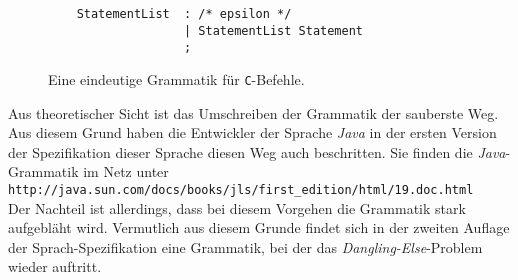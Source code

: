 \begin{enumerate}
\begin{figure}[!ht]
\begin{Verbatim}
    StatementList  : /* epsilon */
                   | StatementList Statement
                   ;
    \end{Verbatim}
    \vspace*{-0.3cm}
    \caption{Eine eindeutige Grammatik f\"ur \texttt{C}-Befehle.}
    \label{fig:dangling-else-correct.y}
\end{figure}

      Aus theoretischer Sicht ist das Umschreiben der Grammatik der sauberste Weg.  
      Aus diesem Grund haben die Entwickler der Sprache \textsl{Java} in der ersten Version der
      Spezifikation dieser Sprache \cite{gosling:96} diesen Weg auch beschritten.  Sie finden die
      \textsl{Java}-Grammatik im Netz unter
      \\[0.2cm]
      \hspace*{1.3cm}
      \texttt{http://java.sun.com/docs/books/jls/first\_edition/html/19.doc.html}
      \\[0.2cm]
      Der Nachteil ist allerdings, dass bei diesem Vorgehen die Grammatik stark aufgebl\"aht wird. 
      Vermutlich aus diesem Grunde findet sich in der zweiten Auflage der Sprach-Spezifikation eine
      Grammatik, bei der das \emph{Dangling-Else}-Problem wieder auftritt. 


\end{enumerate}
